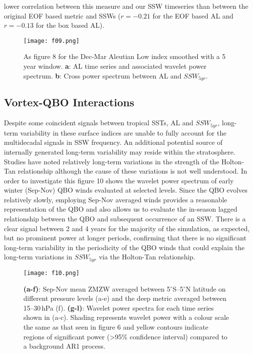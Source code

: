 \documentclass[wcd, manuscript]{copernicus}
\begin{document}
lower correlation between this measure and our SSW timeseries than between the original EOF based metric and SSWs ($r = -0.21$ for the EOF based AL and $r = -0.13$ for the box based AL).


\begin{center}
\begin{figure}[h!]
\texttt{[image: f09.png]}
\caption{As figure 8 for the Dec-Mar Aleutian Low index smoothed with a 5 year window. \textbf{a}: AL time series and associated wavelet power spectrum. \textbf{b}: Cross power spectrum between AL and $SSW_{5yr}$.}
\end{figure}
\end{center}



\subsection{Vortex-QBO Interactions}
Despite some coincident signals between tropical SSTs, AL and $SSW_{5yr}$, long-term variability in these surface indices are unable to fully account for the  multidecadal signals in SSW frequency. An additional potential source of internally generated long-term variability may reside within the stratosphere. Studies have noted relatively long-term variations in the strength of the Holton-Tan relationship \citep{Lu2008, Lu14, OspEA10} although the cause of these variations is not well understood. In order to investigate this figure 10 shows the wavelet power spectrum of early winter (Sep-Nov) QBO winds evaluated at selected levels. Since the QBO evolves relatively slowly, employing Sep-Nov averaged winds provides a reasonable representation of the QBO and also allows us to evaluate the in-season lagged relationship between the QBO and subsequent occurrence of an SSW. There is a clear signal between 2 and 4 years for the majority of the simulation, as expected, but no prominent power at longer periods,  confirming that there is no significant long-term variability in the periodicity of the QBO winds that could explain the long-term variations in $SSW_{5yr}$ via the Holton-Tan relationship.

\begin{center}
\begin{figure}[h!]
\noindent\texttt{[image: f10.png]}
\caption{\textbf{(a-f)}: Sep-Nov mean ZMZW averaged between 5$^\circ$S--5$^\circ$N latitude on different pressure levels (a-e) and the deep metric averaged between 15--30\,hPa (f). \textbf{(g-l)}: Wavelet power spectra for each time series shown in (a-c). Shading represents wavelet power with a colour scale the same as that seen in figure 6 and yellow contours indicate regions of significant power (>95\% confidence interval) compared to a background AR1 process.}
\label{fig4}
\end{figure}
\end{center}
\end{document}
